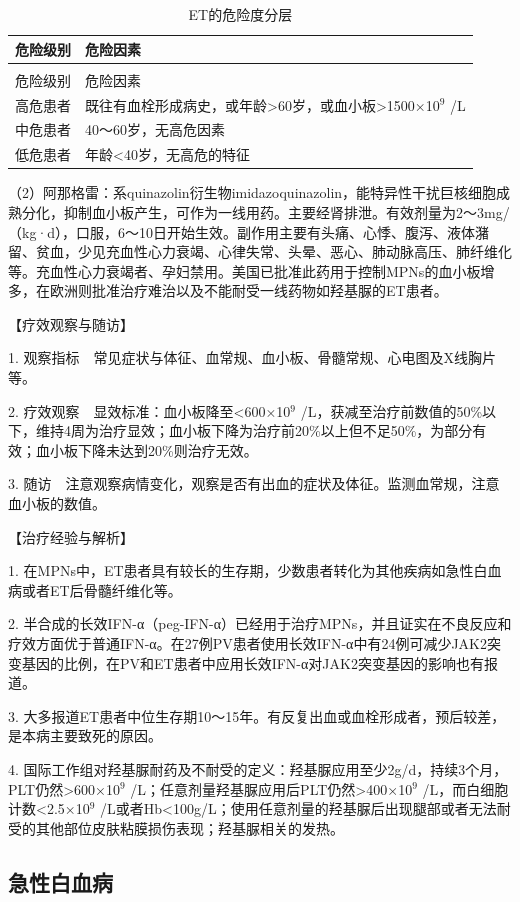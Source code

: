 \begin{longtable}[]{@{}ll@{}}
    \caption{ET的危险度分层}
    \label{tab5-1-2}\\
\toprule
危险级别 & 危险因素\tabularnewline
\midrule
\endfirsthead
\caption[]{ET的危险度分层}\\
\toprule
危险级别 & 危险因素\tabularnewline
\midrule
\endhead
\bottomrule
\endfoot
高危患者 &
既往有血栓形成病史，或年龄\textgreater{}60岁，或血小板\textgreater{}1500×10$^{9}$
/L\tabularnewline
中危患者 & 40～60岁，无高危因素\tabularnewline
低危患者 & 年龄<40岁，无高危的特征\tabularnewline
\end{longtable}

（2）阿那格雷：系quinazolin衍生物imidazoquinazolin，能特异性干扰巨核细胞成熟分化，抑制血小板产生，可作为一线用药。主要经肾排泄。有效剂量为2～3mg/（kg·d），口服，6～10日开始生效。副作用主要有头痛、心悸、腹泻、液体潴留、贫血，少见充血性心力衰竭、心律失常、头晕、恶心、肺动脉高压、肺纤维化等。充血性心力衰竭者、孕妇禁用。美国已批准此药用于控制MPNs的血小板增多，在欧洲则批准治疗难治以及不能耐受一线药物如羟基脲的ET患者。

【疗效观察与随访】

1.
观察指标　常见症状与体征、血常规、血小板、骨髓常规、心电图及X线胸片等。

2. 疗效观察　显效标准：血小板降至<600×10$^{9}$
/L，获减至治疗前数值的50\%以下，维持4周为治疗显效；血小板下降为治疗前20\%以上但不足50\%，为部分有效；血小板下降未达到20\%则治疗无效。

3.
随访　注意观察病情变化，观察是否有出血的症状及体征。监测血常规，注意血小板的数值。

【治疗经验与解析】

1.
在MPNs中，ET患者具有较长的生存期，少数患者转化为其他疾病如急性白血病或者ET后骨髓纤维化等。

2.
半合成的长效IFN-α（peg-IFN-α）已经用于治疗MPNs，并且证实在不良反应和疗效方面优于普通IFN-α。在27例PV患者使用长效IFN-α中有24例可减少JAK2突变基因的比例，在PV和ET患者中应用长效IFN-α对JAK2突变基因的影响也有报道。

3.
大多报道ET患者中位生存期10～15年。有反复出血或血栓形成者，预后较差，是本病主要致死的原因。

4.
国际工作组对羟基脲耐药及不耐受的定义：羟基脲应用至少2g/d，持续3个月，PLT仍然\textgreater{}600×10$^{9}$
/L；任意剂量羟基脲应用后PLT仍然\textgreater{}400×10$^{9}$
/L，而白细胞计数<2.5×10$^{9}$
/L或者Hb<100g/L；使用任意剂量的羟基脲后出现腿部或者无法耐受的其他部位皮肤粘膜损伤表现；羟基脲相关的发热。

\subsection{急性白血病}

